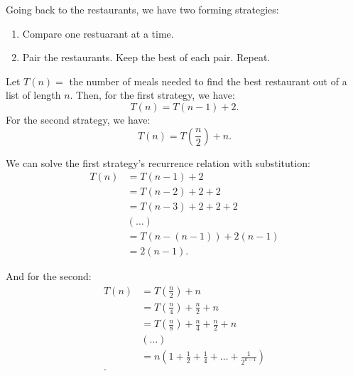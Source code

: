 \begin{eg}
	Going back to the restaurants, we have two forming strategies:
	\begin{enumerate}
		\item Compare one restuarant at a time.
		\item Pair the restaurants. Keep the best of each pair. Repeat.
	\end{enumerate}
	Let \( T(n) =  \) the number of meals needed to find the best restaurant out of a list of length \( n \). Then, for the first strategy, we have: \[
		T(n) = T(n - 1) + 2
		.\] For the second strategy, we have: \[
			T(n) = T\left(\frac{n}{2}\right) + n
		.\] 

	We can solve the first strategy's recurrence relation with substitution:
	\begin{align*}
		T(n) & = T(n- 1) + 2 \\
					& = T(n-2) + 2 + 2 \\
					& = T(n-3) + 2 + 2 + 2 \\
					& (\ldots) \\
					& = T(n - (n - 1)) + 2(n - 1) \\
					& = 2(n - 1) \tag{\( T(1) = 0 \)}
	.\end{align*}

	And for the second:
	\begin{align*}
		T(n) &= T\left(\frac{n}{2}\right) + n \\
					&= T\left(\frac{n}{4}\right) + \frac{n}{2} + n \\
					&= T\left(\frac{n}{8}\right) + \frac{n}{4} + \frac{n}{2} + n \\
					&(\ldots ) \\
					&=n\left(1 + \frac{1}{2} + \frac{1}{4} + \ldots + \frac{1}{2^{k-1}}\right) \\
	.\end{align*}
\end{eg}
